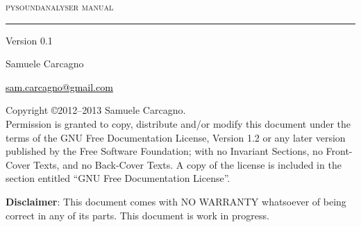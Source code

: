 \begin{center}
\Huge \textsc{pysoundanalyser manual} \\
\rule{\textwidth}{1mm}
\end{center}
{\flushright \normalsize Version 0.1}\\
\begin{center}
\vspace{.2cm}

\Large Samuele Carcagno
\normalsize \\
\vspace{.3cm}


\href{mailto:sam.carcagno@gmail.com}{\textcolor{black}{sam.carcagno@gmail.com}}
\end{center}


\clearpage
\noindent Copyright \copyright  2012--2013  Samuele Carcagno.\\
      Permission is granted to copy, distribute and/or modify this document
      under the terms of the GNU Free Documentation License, Version 1.2
      or any later version published by the Free Software Foundation;
      with no Invariant Sections, no Front-Cover Texts, and no Back-Cover
	 Texts.  A copy of the license is included in the section entitled ``GNU      Free Documentation License''.

\vspace{2cm}
\noindent \textbf{Disclaimer}: This document comes with NO WARRANTY whatsoever of being correct in any of its parts.
This document is work in progress.
